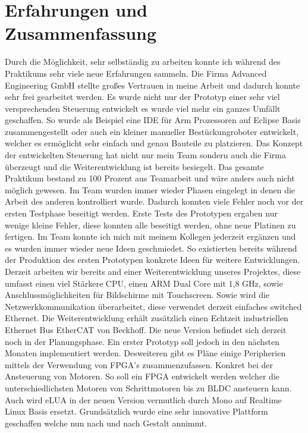 \documentclass[praktikum,german]{hgbthesis}
\begin{document}
\chapter{Erfahrungen und Zusammenfassung}
Durch die Möglichkeit, sehr selbständig zu arbeiten konnte ich während des Praktikums sehr viele neue Erfahrungen sammeln. Die Firma Advanced Engineering GmbH stellte großes Vertrauen in meine Arbeit und dadurch konnte sehr frei gearbeitet werden. Es wurde nicht nur der Prototyp einer sehr viel versprechenden Steuerung entwickelt es wurde viel mehr ein ganzes Umfällt geschaffen. So wurde als Beispiel eine IDE für Arm Prozessoren auf Eclipse Basis zusammengestellt oder auch ein kleiner manueller Bestückungroboter entwickelt, welcher es ermöglicht sehr einfach und genau Bauteile zu platzieren. Das Konzept der entwickelten Steuerung hat nicht nur mein Team sondern auch die Firma überzeugt und die Weiterentwicklung ist bereits besiegelt. Das gesamte Praktikum bestand zu 100 Prozent aus Teamarbeit und wäre anders auch nicht möglich gewesen. Im Team wurden immer wieder Phasen eingelegt in denen die Arbeit des anderen kontrolliert wurde. Dadurch konnten viele Fehler noch vor der ersten Testphase beseitigt werden. Erste Tests des Prototypen ergaben nur wenige kleine Fehler, diese konnten alle beseitigt werden, ohne neue Platinen zu fertigen. Im Team konnte ich mich mit meinem Kollegen jederzeit ergänzen und es wurden immer wieder neue Ideen geschmiedet. So existierten bereits während der Produktion des ersten Prototypen konkrete Ideen für weitere Entwicklungen. Derzeit arbeiten wir bereits and einer Weiterentwicklung unseres Projektes, diese umfasst einen viel Stärkere CPU, einen ARM Dual Core mit 1,8 GHz, sowie Anschlussmöglichkeiten für Bildschirme mit Touchscreen. Sowie wird die Netzwerkkommunikation überarbeitet, diese verwendet derzeit einfaches switched Ethernet. Die Weiterentwicklung erhält zusätzlich einen Echtzeit industriellen Ethernet Bus EtherCAT von Beckhoff. Die neue Version befindet sich derzeit noch in der Planungsphase. Ein erster Prototyp soll jedoch in den nächsten Monaten implementiert werden. Desweiteren gibt es Pläne einige Peripherien mittels der Verwendung von FPGA's zusammenzufassen. Konkret bei der Ansteuerung von Motoren. So soll ein FPGA entwickelt werden welcher die unterschiedlichsten Motoren von Schrittmotoren bis zu BLDC ansteuern kann. Auch wird eLUA in der neuen Version vermutlich durch Mono auf Realtime Linux Basis ersetzt. Grundsätzlich wurde eine sehr innovative Plattform geschaffen welche nun nach und nach Gestalt annimmt.


%


%
\end{document}

